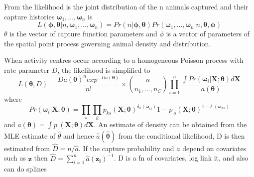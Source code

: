 \documentclass[a4paper,12pt]{article}
\begin{document}

From \citep*{Borchers2008} the likelihood is the joint distribution of the n animals captured and their capture histories $\bm{\omega}_1, ..., \bm{\omega}_n$ is 
$$L(\bm{\phi},\bm{\theta} | n, \bm{\omega}_1, ..., \bm{\omega}_n) =  Pr(n | \bm{\phi}, \bm{\theta})Pr(\bm{\omega}_1, ..., \bm{\omega}_n | n, \bm{\theta}, \bm{\phi})$$ 
$\theta$ is the vector of capture function parameters and $\phi$ is a vector of parameters of the spatial point process governing animal density and distribution.

When activity centres occur according to a homogeneous Poisson process with rate parameter $D$, the likelihood is simplified to 
$$L(\bm{\theta},D) = \frac{{Da(\bm{\theta})}^{n}exp^{-Da(\bm{\theta})}}{n!} \times \binom{n}{n_1, ..., n_C}\prod_{i=1}^{n}\frac{\int Pr(\bm{\omega}_{i}|\textbf{X};\bm{\theta})d\textbf{X}}{a(\bm{\theta})}$$
 where 
$$Pr(\bm{\omega}_{i} | \bm{X};\bm{\theta}) = \prod_{s} \prod_{k} p_{ks}(\textbf{X};\bm{\theta})^{\delta_{k}(\bm{\omega}_{is})}{1-p_{.s}(\textbf{X}; \bm{\theta})}^{1-\delta_{.}(\bm{\omega}_{ks})}$$
and $a(\bm{\theta}) = \int p_{.}(\textbf{X}; \bm{\theta}) d\textbf{X}$. An estimate of density can be obtained from the MLE estimate of $\hat{\theta}$ and hence $\hat{a}(\hat{\bm{\theta}})$ from the conditional likelihood, D is then estimated from $\hat{D}=n/\hat{a}$. If the capture probability and $a$ depend on covariates such as $\bm{z}$ then $\hat{D}=\sum_{i=1}^{n}\hat{a}(\bm{z_i})^{-1}$.  D is a fn of covariates, log link it, and also can do splines
\end{document}
